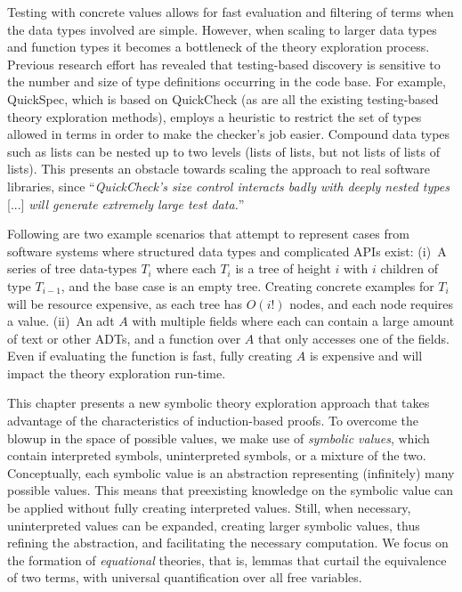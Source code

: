 Testing with concrete values allows for fast evaluation and filtering of terms when the data types involved are simple.
However, when scaling to larger data types and function types it becomes a bottleneck of the theory exploration process.
Previous research effort has revealed that testing-based discovery is sensitive to the number and size of type definitions occurring in the code base.
For example, QuickSpec, which is based on QuickCheck (as are all the existing testing-based theory exploration methods), employs a heuristic to restrict the set of types allowed in terms in order to make the checker's job easier.
Compound data types such as lists can be nested up to two levels (lists of lists, but not lists of lists of lists).
This presents an obstacle towards scaling the approach to real software libraries, since ``\textit{QuickCheck's size control
interacts badly with deeply nested types} [...] \textit{will generate extremely large test data.}''~\cite{JFP2017:Smallbonequickspec2}

Following are two example scenarios that attempt to represent cases from software systems where structured data types and complicated APIs exist:
(i)~A series of tree data-types $T_i$ where each $T_i$ is a tree of height $i$ with $i$ children of type $T_{i-1}$, and the base case is an empty tree.
Creating concrete examples for $T_i$ will be resource expensive, as each tree has $O(i!)$ nodes, and each node requires a value.
(ii)~An \gls{adt} $A$ with multiple fields where each can contain a large amount of text or other ADTs, and a function over $A$ that only accesses one of the fields.
Even if evaluating the function is fast, fully creating $A$ is expensive and will impact the theory exploration run-time.

This chapter presents a new symbolic theory exploration approach that takes advantage of the characteristics of induction-based proofs.
To overcome the blowup in the space of possible values, we make use of \emph{symbolic values}, which contain interpreted symbols, uninterpreted symbols, or a mixture of the two. 
Conceptually, each symbolic value is an abstraction representing (infinitely) many possible values. 
This means that preexisting knowledge on the symbolic value can be applied without fully creating interpreted values.
Still, when necessary, uninterpreted values can be expanded, creating larger symbolic values, thus refining the abstraction, and facilitating the necessary computation.
We focus on the formation of \emph{equational} theories, that is, lemmas that curtail the equivalence of two terms, with universal quantification over all free variables.

